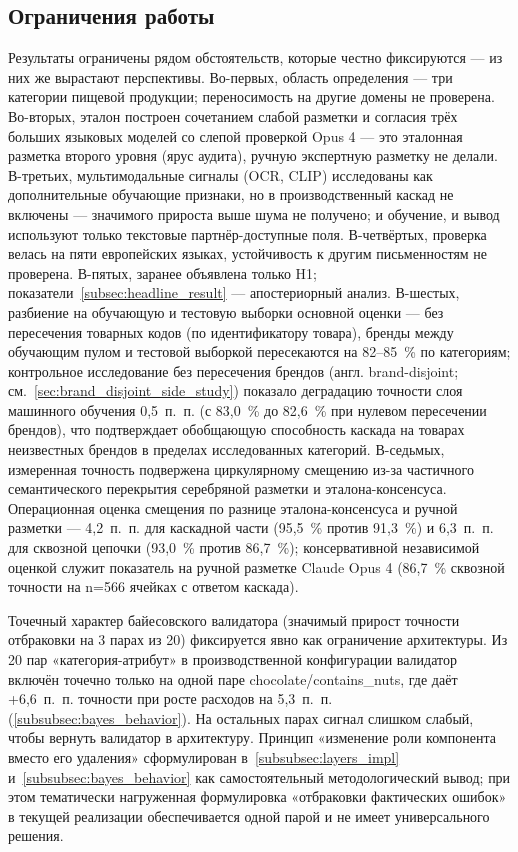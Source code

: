 \subsection*{Ограничения работы}

Результаты ограничены рядом обстоятельств, которые честно фиксируются — из них же вырастают перспективы. Во-первых, область определения — три категории пищевой продукции; переносимость на другие домены не проверена. Во-вторых, эталон построен сочетанием слабой разметки и согласия трёх больших языковых моделей со слепой проверкой Opus 4 — это эталонная разметка второго уровня (ярус аудита), ручную экспертную разметку не делали. В-третьих, мультимодальные сигналы (OCR, CLIP) исследованы как дополнительные обучающие признаки, но в производственный каскад не включены --- значимого прироста выше шума не получено; и обучение, и вывод используют только текстовые партнёр-доступные поля. В-четвёртых, проверка велась на пяти европейских языках, устойчивость к другим письменностям не проверена. В-пятых, заранее объявлена только H1; показатели~\ref{subsec:headline_result} — апостериорный анализ. В-шестых, разбиение на обучающую и тестовую выборки основной оценки --- без пересечения товарных кодов (по идентификатору товара), бренды между обучающим пулом и тестовой выборкой пересекаются на 82--85~\% по категориям; контрольное исследование без пересечения брендов (англ. brand-disjoint; см.~\ref{sec:brand_disjoint_side_study}) показало деградацию точности слоя машинного обучения 0,5~п.~п. (с 83,0~\% до 82,6~\% при нулевом пересечении брендов), что подтверждает обобщающую способность каскада на товарах неизвестных брендов в пределах исследованных категорий. В-седьмых, измеренная точность подвержена циркулярному смещению из-за частичного семантического перекрытия серебряной разметки и эталона-консенсуса. Операционная оценка смещения по разнице эталона-консенсуса и ручной разметки --- 4,2~п.~п. для каскадной части (95,5~\% против 91,3~\%) и 6,3~п.~п. для сквозной цепочки (93,0~\% против 86,7~\%); консервативной независимой оценкой служит показатель на ручной разметке Claude Opus 4 (86,7~\% сквозной точности на n=566 ячейках с ответом каскада).

Точечный характер байесовского валидатора (значимый прирост точности отбраковки на 3 парах из 20) фиксируется явно как ограничение архитектуры. Из 20 пар «категория-атрибут» в производственной конфигурации валидатор включён точечно только на одной паре chocolate/contains\_nuts, где даёт +6,6~п.~п. точности при росте расходов на 5,3~п.~п. (\ref{subsubsec:bayes_behavior}). На остальных парах сигнал слишком слабый, чтобы вернуть валидатор в архитектуру. Принцип «изменение роли компонента вместо его удаления» сформулирован в~\ref{subsubsec:layers_impl} и~\ref{subsubsec:bayes_behavior} как самостоятельный методологический вывод; при этом тематически нагруженная формулировка «отбраковки фактических ошибок» в текущей реализации обеспечивается одной парой и не имеет универсального решения.

